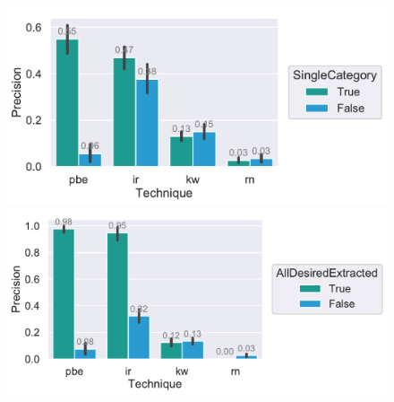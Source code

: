 \documentclass[\myrootdir/main.tex]{subfiles}
\begin{document}
\begin{figure}[htbp]
	\centering
	\begin{minipage}{0.45\textwidth}
		\centering
		\includegraphics[width=\textwidth, clip]{img/big-study/precision-category-singularity-all.pdf}
		\caption{}
		\label{fig:precision-category-singularity-all}
	\end{minipage}\hfill
	\begin{minipage}{0.45\textwidth}
		\centering
		\includegraphics[width=\textwidth, clip]{img/big-study/single-cateogry-precision-all.pdf}
		\caption{}
		\label{fig:single-cateogry-precision-all}
	\end{minipage}
\end{figure}
\end{document}
